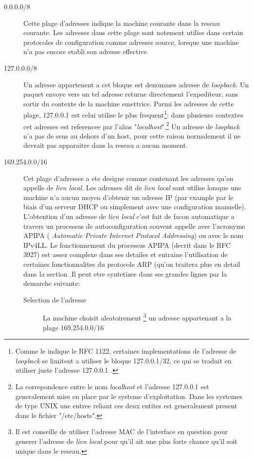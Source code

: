 \begin{description}
\item[0.0.0.0/8]
Cette plage d'adresses indique la machine courante dans la reseau courante.
Les adresses dans cette plage sont notement utilise dans certain protocoles de
configuration comme adresses source, lorsque une machine n'a pas encore etabli
son adresse effective.

\item[127.0.0.0/8]
Un adresse appartenent a cet bloque est denommes adresse de {\it loopback}.  Un
paquet envoye vers un tel adresse returne directement l'expediteur, sans sortir
du contexte de la machine emettrice. Parmi les adresses de cette plage,
127.0.0.1 est celui utilise le plus frequent\footnote{Comme le indique
le RFC 1122, certaines implementations de l'adresse de {\it loopback} se
limitent a utiliser le bloque 127.0.0.1/32, ce qui se traduit en utiliser juste
l'adresse 127.0.0.1 .}: dans plusieurs contextes cet adresses est referencee par
l'alias "{\it localhost}".\footnote{La correpondence entre le nom {\it localhost} et
l'adresse 127.0.0.1 est generalement mise en place par le systeme d'exploitation.
Dans les systemes de type UNIX une entree reliant ces deux entites est generalement
present dans le fichier "/etc/hosts".}
Un adresse de {\it loopback} n'a pas de sens au dehors
d'un host, pour cette raison normalement il ne devrait pas apparaitre dans la
reseau a aucun moment.


\item[169.254.0.0/16]
Cet plage d'adresses a ete designe comme contenant les adresses qu'on appelle
de {\it lien local}.  Les adresses dit de {\it lien local} sont utilise lorsque
une machine n'a aucun moyen d'obtenir un adresse IP (par example par le biais
d'un serveur DHCP ou simplement avec une configuration manuelle).  L'obtention
d'un adresse de {\it lien local} c'est fait de facon automatique a travers un
processus de autoconfiguration souvent appelle avec l'acronyme APIPA ({\it
Automatic Private Internet Protocol Addressing}) ou avec le nom IPv4LL.  Le
fonctionnement du processus APIPA (decrit dans le RFC 3927) est assez complexe
dans ses detailes et entraine l'utilisation de certaines fonctionnalites du
protocole ARP (qu'on traitera plus en detail dans la section %
.Il peut etre syntetizee dans ses grandes lignes par la demarche suivante:

\begin{description}
\item[Selection de l'adresse]
La machine choisit aleatoirement
    \footnote{Il est conseille de utiliser l'adresse MAC de l'interface en question
    pour generer l'adresse de {\it lien local} pour qu'il ait une plus forte chance
    qu'il soit unique dans le reseau.} 
un adresse appartenant a la plage 169.254.0.0/16


\end{description}
\end{description}

